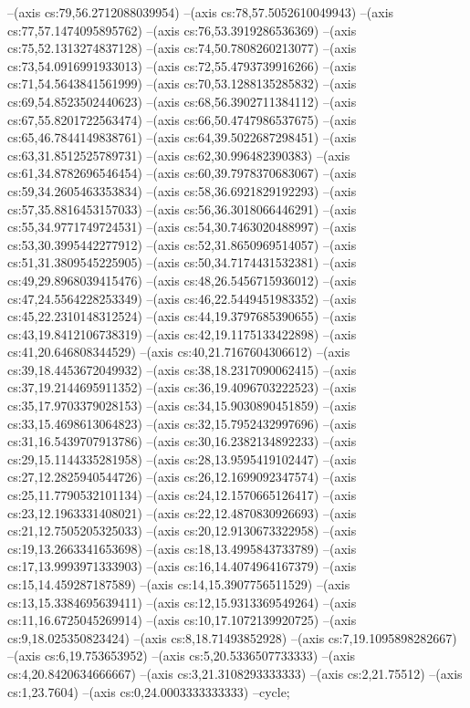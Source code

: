--(axis cs:79,56.2712088039954)
--(axis cs:78,57.5052610049943)
--(axis cs:77,57.1474095895762)
--(axis cs:76,53.3919286536369)
--(axis cs:75,52.1313274837128)
--(axis cs:74,50.7808260213077)
--(axis cs:73,54.0916991933013)
--(axis cs:72,55.4793739916266)
--(axis cs:71,54.5643841561999)
--(axis cs:70,53.1288135285832)
--(axis cs:69,54.8523502440623)
--(axis cs:68,56.3902711384112)
--(axis cs:67,55.8201722563474)
--(axis cs:66,50.4747986537675)
--(axis cs:65,46.7844149838761)
--(axis cs:64,39.5022687298451)
--(axis cs:63,31.8512525789731)
--(axis cs:62,30.996482390383)
--(axis cs:61,34.8782696546454)
--(axis cs:60,39.7978370683067)
--(axis cs:59,34.2605463353834)
--(axis cs:58,36.6921829192293)
--(axis cs:57,35.8816453157033)
--(axis cs:56,36.3018066446291)
--(axis cs:55,34.9771749724531)
--(axis cs:54,30.7463020488997)
--(axis cs:53,30.3995442277912)
--(axis cs:52,31.8650969514057)
--(axis cs:51,31.3809545225905)
--(axis cs:50,34.7174431532381)
--(axis cs:49,29.8968039415476)
--(axis cs:48,26.5456715936012)
--(axis cs:47,24.5564228253349)
--(axis cs:46,22.5449451983352)
--(axis cs:45,22.2310148312524)
--(axis cs:44,19.3797685390655)
--(axis cs:43,19.8412106738319)
--(axis cs:42,19.1175133422898)
--(axis cs:41,20.646808344529)
--(axis cs:40,21.7167604306612)
--(axis cs:39,18.4453672049932)
--(axis cs:38,18.2317090062415)
--(axis cs:37,19.2144695911352)
--(axis cs:36,19.4096703222523)
--(axis cs:35,17.9703379028153)
--(axis cs:34,15.9030890451859)
--(axis cs:33,15.4698613064823)
--(axis cs:32,15.7952432997696)
--(axis cs:31,16.5439707913786)
--(axis cs:30,16.2382134892233)
--(axis cs:29,15.1144335281958)
--(axis cs:28,13.9595419102447)
--(axis cs:27,12.2825940544726)
--(axis cs:26,12.1699092347574)
--(axis cs:25,11.7790532101134)
--(axis cs:24,12.1570665126417)
--(axis cs:23,12.1963331408021)
--(axis cs:22,12.4870830926693)
--(axis cs:21,12.7505205325033)
--(axis cs:20,12.9130673322958)
--(axis cs:19,13.2663341653698)
--(axis cs:18,13.4995843733789)
--(axis cs:17,13.9993971333903)
--(axis cs:16,14.4074964167379)
--(axis cs:15,14.459287187589)
--(axis cs:14,15.3907756511529)
--(axis cs:13,15.3384695639411)
--(axis cs:12,15.9313369549264)
--(axis cs:11,16.6725045269914)
--(axis cs:10,17.1072139920725)
--(axis cs:9,18.025350823424)
--(axis cs:8,18.71493852928)
--(axis cs:7,19.1095898282667)
--(axis cs:6,19.753653952)
--(axis cs:5,20.5336507733333)
--(axis cs:4,20.8420634666667)
--(axis cs:3,21.3108293333333)
--(axis cs:2,21.75512)
--(axis cs:1,23.7604)
--(axis cs:0,24.0003333333333)
--cycle;

